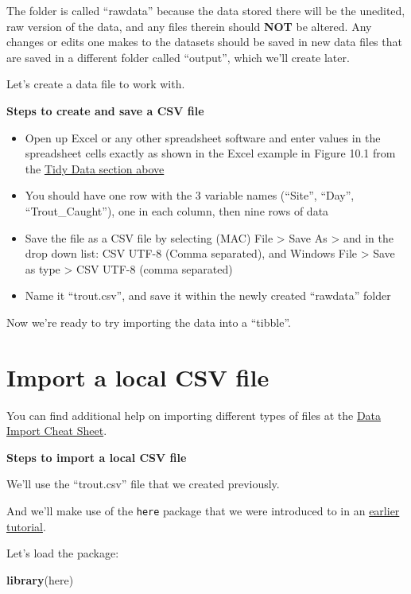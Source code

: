 \documentclass[
]{book}
\newenvironment{Shaded}{\begin{snugshade}}{\end{snugshade}}
\newcommand{\FunctionTok}[1]{\textcolor[rgb]{0.13,0.29,0.53}{\textbf{#1}}}
\newcommand{\NormalTok}[1]{#1}
\providecommand{\tightlist}{%
  \setlength{\itemsep}{0pt}\setlength{\parskip}{0pt}}
\begin{document}
The folder is called ``rawdata'' because the data stored there will be the unedited, raw version of the data, and any files therein should \textbf{NOT} be altered. Any changes or edits one makes to the datasets should be saved in new data files that are saved in a different folder called ``output'', which we'll create later.

Let's create a data file to work with.

\textbf{Steps to create and save a CSV file}

\begin{itemize}
\tightlist
\item
  Open up Excel or any other spreadsheet software and enter values in the spreadsheet cells exactly as shown in the Excel example in Figure 10.1 from the \hyperref[tidy_data]{Tidy Data section above}
\item
  You should have one row with the 3 variable names (``Site'', ``Day'', ``Trout\_Caught''), one in each column, then nine rows of data
\item
  Save the file as a CSV file by selecting (MAC) File \textgreater{} Save As \textgreater{} and in the drop down list: CSV UTF-8 (Comma separated), and Windows File \textgreater{} Save as type \textgreater{} CSV UTF-8 (comma separated)
\item
  Name it ``trout.csv'', and save it within the newly created ``rawdata'' folder
\end{itemize}

Now we're ready to try importing the data into a ``tibble''.

\section{Import a local CSV file}\label{import_csv_local}

You can find additional help on importing different types of files at the \href{https://github.com/rstudio/cheatsheets/raw/master/data-import.pdf}{Data Import Cheat Sheet}.

\textbf{Steps to import a local CSV file}

We'll use the ``trout.csv'' file that we created previously.

And we'll make use of the \texttt{here} package that we were introduced to in an \hyperref[here_package]{earlier tutorial}.

Let's load the package:

\begin{Shaded}
\begin{Highlighting}[]
\FunctionTok{library}\NormalTok{(here)}
\end{Highlighting}
\end{Shaded}
\end{document}
